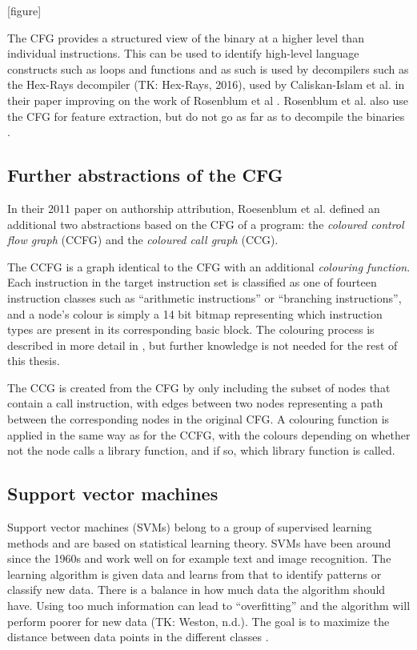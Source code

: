 \documentclass[a4paper,11pt]{kth-mag}
\begin{document}
[figure]

The CFG provides a structured view of the binary at a higher level than
individual instructions. This can be used to identify high-level language
constructs such as loops and functions \parencite{cifuentes1993methodology} and
as such is used by decompilers such as the Hex-Rays decompiler (TK: Hex-Rays,
2016), used by Caliskan-Islam et al. in their paper improving on the work of
Rosenblum et al \parencite{caliskan2015coding}. Rosenblum et al. also use the
CFG for feature extraction, but do not go as far as to decompile the binaries
\parencite{rosenblum2011wrote}.

\subsection{Further abstractions of the CFG}
In their 2011 paper on authorship attribution, Roesenblum et al. defined an
additional two abstractions based on the CFG of a program: the \emph{coloured
control flow graph} (CCFG) and the \emph{coloured call graph} (CCG).

The CCFG is a graph identical to the CFG with an additional \emph{colouring
function}. Each instruction in the target instruction set is classified as one
of fourteen instruction classes such as ``arithmetic instructions'' or
``branching instructions'', and a node's colour is simply a 14 bit bitmap
representing which instruction types are present in its corresponding basic
block. The colouring process is described in more detail in
\parencite{rosenblum2011recovering}, but further knowledge is not needed for
the rest of this thesis.

The CCG is created from the CFG by only including the subset of nodes that contain
a call instruction, with edges between two nodes representing a path between
the corresponding nodes in the original CFG. A colouring function is applied in
the same way as for the CCFG, with the colours depending on whether not the
node calls a library function, and if so, which library function is called.

\subsection{Support vector machines}
Support vector machines (SVMs) belong to a group of supervised learning methods
and are based on statistical learning theory. SVMs have been around since the
1960s and work well on for example text and image recognition. The learning
algorithm is given data and learns from that to identify patterns or classify
new data. There is a balance in how much data the algorithm should have. Using
too much information can lead to “overfitting” and the algorithm will perform
poorer for new data (TK: Weston, n.d.). The goal is to maximize the distance
between data points in the different classes \parencite{awad2004effective}.
\end{document}
